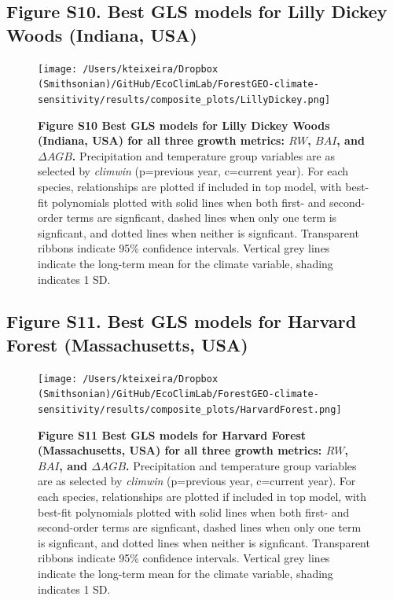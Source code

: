 \documentclass[
]{article}
\begin{document}
\newpage

\hypertarget{figure-s10.-best-gls-models-for-lilly-dickey-woods-indiana-usa}{%
\subsection{Figure S10. Best GLS models for Lilly Dickey Woods (Indiana,
USA)}\label{figure-s10.-best-gls-models-for-lilly-dickey-woods-indiana-usa}}

\begin{figure}
\centering
\texttt{[image: /Users/kteixeira/Dropbox (Smithsonian)/GitHub/EcoClimLab/ForestGEO-climate-sensitivity/results/composite\_plots/LillyDickey.png]}
\caption{\textbf{Figure S10 \textbar{} Best GLS models for Lilly Dickey
Woods (Indiana, USA) for all three growth metrics: \(RW\), \(BAI\), and
\(\Delta AGB\).} Precipitation and temperature group variables are as
selected by \emph{climwin} (p=previous year, c=current year). For each
species, relationships are plotted if included in top model, with
best-fit polynomials plotted with solid lines when both first- and
second-order terms are signficant, dashed lines when only one term is
signficant, and dotted lines when neither is signficant. Transparent
ribbons indicate 95\% confidence intervals. Vertical grey lines indicate
the long-term mean for the climate variable, shading indicates 1 SD.}
\end{figure}

\newpage

\hypertarget{figure-s11.-best-gls-models-for-harvard-forest-massachusetts-usa}{%
\subsection{Figure S11. Best GLS models for Harvard Forest
(Massachusetts,
USA)}\label{figure-s11.-best-gls-models-for-harvard-forest-massachusetts-usa}}

\begin{figure}
\centering
\texttt{[image: /Users/kteixeira/Dropbox (Smithsonian)/GitHub/EcoClimLab/ForestGEO-climate-sensitivity/results/composite\_plots/HarvardForest.png]}
\caption{\textbf{Figure S11 \textbar{} Best GLS models for Harvard
Forest (Massachusetts, USA) for all three growth metrics: \(RW\),
\(BAI\), and \(\Delta AGB\).} Precipitation and temperature group
variables are as selected by \emph{climwin} (p=previous year, c=current
year). For each species, relationships are plotted if included in top
model, with best-fit polynomials plotted with solid lines when both
first- and second-order terms are signficant, dashed lines when only one
term is signficant, and dotted lines when neither is signficant.
Transparent ribbons indicate 95\% confidence intervals. Vertical grey
lines indicate the long-term mean for the climate variable, shading
indicates 1 SD.}
\end{figure}
\end{document}
